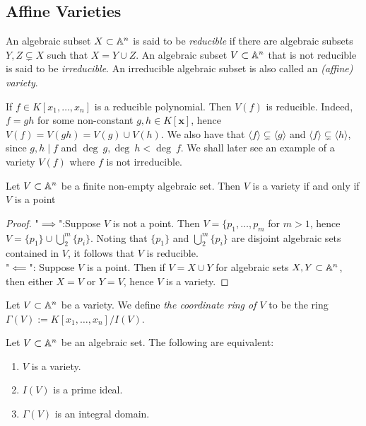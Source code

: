\subsection{Affine Varieties}
\begin{definition}
    An algebraic subset $X\subset \mathbb{A}^n$ is said to be \textit{reducible} if there are algebraic subsets $Y,Z\subsetneq X$ such that $X = Y \cup Z$. An algebraic subset $V\subset \mathbb{A}^n$ that is not reducible is said to be \textit{irreducible}. An irreducible algebraic subset is also called an \textit{(affine) variety}.  
\end{definition}
\begin{remark}
    If $f\in K[x_1,\dots,x_n]$ is a reducible polynomial. Then $V(f)$ is reducible. Indeed, $f=gh$ for some non-constant $g,h\in K[\mathbf{x}]$, hence $V(f)=V(gh)=V(g)\cup V(h)$. We also have that $\langle f\rangle \subsetneq \langle g\rangle$ and $\langle f\rangle \subsetneq \langle h \rangle$, since $g,h\mid f$ and $\deg \ g,\deg \ h <\deg \ f$. We shall later see an example of a variety $V(f)$ where $f$ is not irreducible.
\end{remark}
\begin{proposition}\label{FiniteNonEmptyVarietiesArePoints}
    Let $V\subset \mathbb{A}^n$ be a finite non-empty algebraic set. Then $V$ is a variety if and only if $V$ is a point 
\end{proposition}
\begin{proof}
    "$\implies$":Suppose $V$ is not a point. Then $V=\{p_1,\dots,p_m$ for $m>1$, hence $V = \{p_1\} \cup \bigcup_2^m \{p_i\}$. Noting that $\{p_1\}$ and $\bigcup_2^m\{ p_i\}$ are disjoint algebraic sets contained in $V$, it follows that $V$ is reducible.\\
    "$\impliedby$": Suppose $V$ is a point. Then if $V = X \cup Y$ for algebraic sets $X,Y\subset \mathbb{A}^n$, then either $X=V$ or $Y=V$, hence $V$ is a variety. 
\end{proof}
\begin{definition}
    Let $V\subset \mathbb{A}^n$ be a variety. We define \textit{the coordinate ring of $V$} to be the ring $\Gamma(V):=K[x_1,\dots,x_n]/I(V)$. 
\end{definition}
\begin{proposition}\label{VarietyIffCoordinateRingIsID}
    Let $V\subset \mathbb{A}^n$ be an algebraic set. The following are equivalent:
    \begin{enumerate}
        \item $V$ is a variety.
        \item $I(V)$ is a prime ideal. 
        \item $\Gamma(V)$ is an integral domain. 
    \end{enumerate}
\end{proposition}
